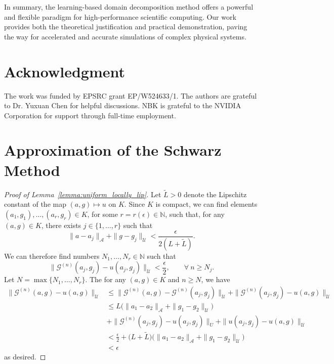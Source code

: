 \documentclass[preprint,11pt]{elsarticle}
\theoremstyle{plain}
\newcommand{\N}{\mathbb{N}}
\newcommand{\G}{\mathcal{G}}
\newcommand{\A}{\mathcal{A}}
\newcommand{\U}{\mathcal{U}}
\begin{document}
In summary, the learning-based domain decomposition method offers a powerful and flexible paradigm for high-performance scientific computing. Our work provides both the theoretical justification and practical demonstration, paving the way for accelerated and accurate simulations of complex physical systems.

\section*{Acknowledgment}
The work was funded by EPSRC grant EP/W524633/1. The authors are grateful to Dr. Yuxuan Chen for helpful discussions. NBK is grateful to the NVIDIA Corporation for support through full-time employment. 
 
 



\appendix
\section{Approximation of the Schwarz Method}
\label{sec:approximation_of_the_schwarz_method}

\begin{proof}[Proof of Lemma~\ref{lemma:uniform_locally_lip}]
    Let $\tilde{L} > 0$ denote the Lipschitz constant of the map $(a,g) \mapsto u$ on $K$. Since $K$ is compact, we can find elements $(a_1,g_1),\dots,(a_r,g_r) \in K$, for some $r = r(\epsilon) \in \N$, such that, for any $(a,g) \in K$, there exists $j \in \{1,\dots,r\}$ such that
    \[\|a - a_j\|_\A + \|g-g_j\|_\U < \frac{\epsilon}{2(L + \tilde{L})}.\]
    We can therefore find numbers $N_1,\dots,N_r \in \N$ such that
    \[\|\G^{(n)}(a_j,g_j) - u(a_j,g_j)\|_\U < \frac{\epsilon}{2}, \qquad \forall \: n \geq N_j.\]
    Let $N = \max \{N_1,\dots,N_r\}$. The for any $(a,g) \in K$ and $n \geq N$, we have
    \begin{align*}
        \|\G^{(n)}(a,g) - u(a,g)\|_\U &\leq \|\G^{(n)}(a,g) - \G^{(n)}(a_j,g_j)\|_\U + \|\G^{(n)}(a_j,g_j) - u(a,g)\|_\U \\
        &\leq L \big ( \|a_1 - a_2\|_\A + \|g_1 - g_2\|_\U \big ) \\ 
        &+ \|\G^{(n)}(a_j,g_j) - u(a_j,g_j)\|_U + \|u(a_j,g_j) - u(a,g)\|_\U \\
        &< \frac{\epsilon}{2} + \big ( L+\tilde{L} \big ) \big ( \|a_1 - a_2\|_\A + \|g_1 - g_2\|_\U \big ) \\
        &< \epsilon
    \end{align*}
    as desired.
\end{proof}
\end{document}
